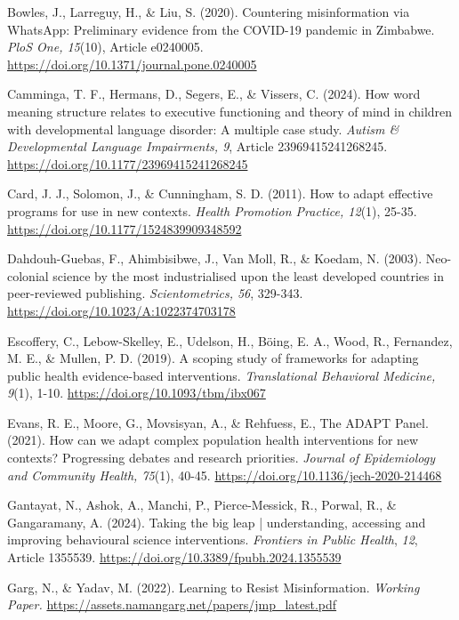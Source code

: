 \documentclass[authordate, reflection]{jote-new-article}
\begin{document}
	Bowles, J., Larreguy, H., \& Liu, S. (2020). Countering misinformation via WhatsApp: Preliminary evidence from the COVID-19 pandemic in Zimbabwe. \emph{PloS One, 15}(10), Article e0240005. \url{https://doi.org/10.1371/journal.pone.0240005}



	Camminga, T. F., Hermans, D., Segers, E., \& Vissers, C. (2024). How word meaning structure relates to executive functioning and theory of mind in children with developmental language disorder: A multiple case study. \emph{Autism \& Developmental Language Impairments, 9}, Article 23969415241268245. \url{https://doi.org/10.1177/23969415241268245}



	Card, J. J., Solomon, J., \& Cunningham, S. D. (2011). How to adapt effective programs for use in new contexts. \emph{Health Promotion Practice, 12}(1), 25-35. \url{https://doi.org/10.1177/1524839909348592}



	Dahdouh-Guebas, F., Ahimbisibwe, J., Van Moll, R., \& Koedam, N. (2003). Neo-colonial science by the most industrialised upon the least developed countries in peer-reviewed publishing. \emph{Scientometrics, 56}, 329-343. \url{https://doi.org/10.1023/A:1022374703178}



	Escoffery, C., Lebow-Skelley, E., Udelson, H., Böing, E. A., Wood, R., Fernandez, M. E., \& Mullen, P. D. (2019). A scoping study of frameworks for adapting public health evidence-based interventions. \emph{Translational Behavioral Medicine, 9}(1), 1-10. \url{https://doi.org/10.1093/tbm/ibx067}



	Evans, R. E., Moore, G., Movsisyan, A., \& Rehfuess, E., The ADAPT Panel. (2021). How can we adapt complex population health interventions for new contexts? Progressing debates and research priorities. \emph{Journal of Epidemiology and Community Health, 75}(1), 40-45. \url{https://doi.org/10.1136/jech-2020-214468}



	Gantayat, N., Ashok, A., Manchi, P., Pierce-Messick, R., Porwal, R., \& Gangaramany, A. (2024). Taking the big leap | understanding, accessing and improving behavioural science interventions. \emph{Frontiers in Public Health}, \emph{12}, Article 1355539. \url{https://doi.org/10.3389/fpubh.2024.1355539}



	Garg, N., \& Yadav, M. (2022). Learning to Resist Misinformation. \emph{Working Paper.} \url{https://assets.namangarg.net/papers/jmp\_latest.pdf}
\end{document}
